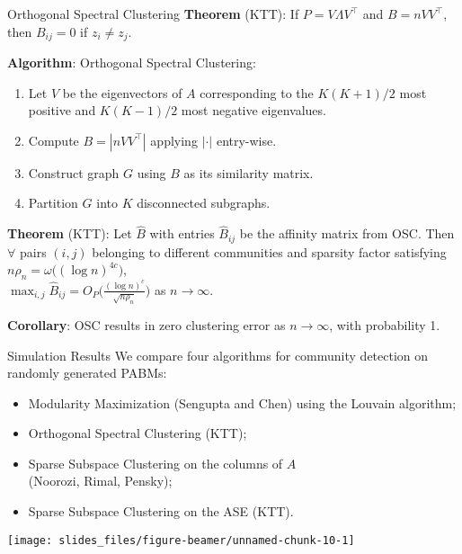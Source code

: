 \documentclass[
  ignorenonframetext,
]{beamer}
\providecommand{\tightlist}{%
  \setlength{\itemsep}{0pt}\setlength{\parskip}{0pt}}
\begin{document}
\begin{frame}{Orthogonal Spectral Clustering}
\protect\hypertarget{orthogonal-spectral-clustering}{}
\textbf{Theorem} (KTT): If \(P = V \Lambda V^\top\) and
\(B = n V V^\top\),\\
then \(B_{ij} = 0\) if \(z_i \neq z_j\).

\textbf{Algorithm}: Orthogonal Spectral Clustering:

\begin{enumerate}
\tightlist
\item
  Let \(V\) be the eigenvectors of \(A\) corresponding to the
  \(K (K+1)/2\) most positive and \(K (K-1) / 2\) most negative
  eigenvalues.
\item
  Compute \(B = |n V V^\top|\) applying \(|\cdot|\) entry-wise.
\item
  Construct graph \(G\) using \(B\) as its similarity matrix.
\item
  Partition \(G\) into \(K\) disconnected subgraphs.
\end{enumerate}

\textbf{Theorem} (KTT): Let \(\hat{B}\) with entries \(\hat{B}_{ij}\) be
the affinity matrix from OSC. Then \(\forall\) pairs \((i, j)\)
belonging to different communities and sparsity factor satisfying
\(n \rho_n = \omega\big((\log n)^{4c}\big)\),\\
\(\max_{i, j} \hat{B}_{ij} = O_P \Big( \frac{(\log n)^c}{\sqrt{n \rho_n}} \Big)\)
as \(n \to \infty\).

\textbf{Corollary}: OSC results in zero clustering error as
\(n \to \infty\), with probability 1.
\end{frame}

\begin{frame}{Simulation Results}
\protect\hypertarget{simulation-results}{}
We compare four algorithms for community detection on randomly generated
PABMs:

\begin{itemize}
\tightlist
\item
  Modularity Maximization (Sengupta and Chen) using the Louvain
  algorithm;
\item
  Orthogonal Spectral Clustering (KTT);
\item
  Sparse Subspace Clustering on the columns of \(A\)\\
  (Noorozi, Rimal, Pensky);
\item
  Sparse Subspace Clustering on the ASE (KTT).
\end{itemize}

\begin{center}\texttt{[image: slides\_files/figure-beamer/unnamed-chunk-10-1]} \end{center}
\end{frame}
\end{document}
